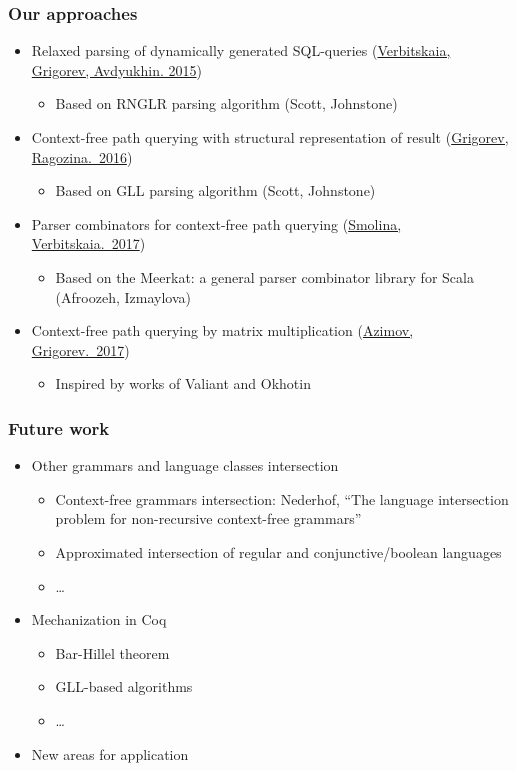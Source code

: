 \documentclass{beamer}
\begin{document}
\begin{frame}
  \transwipe[direction=90]
  \frametitle{Our approaches}
  \begin{itemize}
    \item Relaxed parsing of dynamically generated SQL-queries (\href{https://link.springer.com/chapter/10.1007/978-3-319-41579-6\_22}{Verbitskaia, Grigorev, Avdyukhin. 2015})
    \begin{itemize}
        \item Based on RNGLR parsing algorithm (Scott, Johnstone)
    \end{itemize}
    \item Context-free path querying with structural representation of result (\href{https://arxiv.org/abs/1612.08872}{Grigorev, Ragozina.~2016})
    \begin{itemize}
        \item Based on GLL parsing algorithm (Scott, Johnstone)
    \end{itemize}
    \item Parser combinators for context-free path querying (\href{http://plc.sfedu.ru/files/PLC-2017-proceedings.pdf\#page=233}{Smolina, Verbitskaia.~2017})
    \begin{itemize}
        \item Based on the Meerkat: a general parser combinator library for Scala (Afroozeh, Izmaylova)
    \end{itemize}
    \item Context-free path querying by matrix multiplication (\href{https://arxiv.org/abs/1707.01007}{Azimov, Grigorev.~2017})
    \begin{itemize}
        \item Inspired by works of Valiant and Okhotin
    \end{itemize}
  \end{itemize}
\end{frame}

\begin{frame}[fragile]
\transwipe[direction=90]
\frametitle{Future work}
\begin{itemize}
  \item Other grammars and language classes intersection
  \begin{itemize}
     \item Context-free grammars intersection: Nederhof, ``The language intersection problem for non-recursive context-free grammars''
     \item Approximated intersection of regular and conjunctive/boolean languages
     \item \dots
  \end{itemize}
  \item Mechanization in Coq
  \begin{itemize}
     \item Bar-Hillel theorem
     \item GLL-based algorithms
     \item \dots
  \end{itemize}
  \item New areas for application
\end{itemize}
\end{frame}
            
\end{document}
